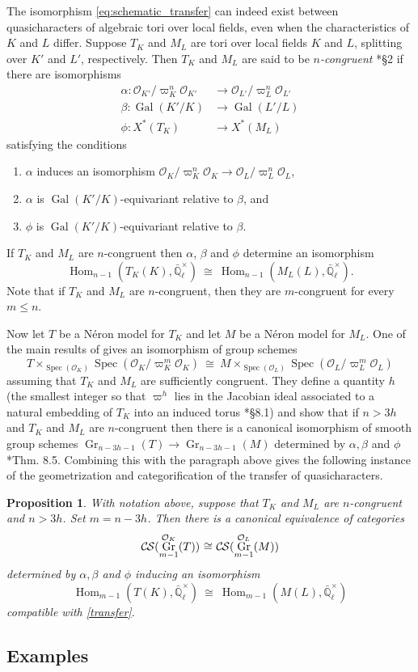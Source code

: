 \documentclass[10pt]{amsart}
\theoremstyle{plain}
\newtheorem{proposition}[theorem]{Proposition}
\theoremstyle{definition}
\theoremstyle{remark}
\newcommand{\EE}{\mathbb{\bar Q}_\ell}
\newcommand{\OK}{\mathcal{O}_K}
\newcommand{\OL}{\mathcal{O}_L}
\newcommand{\OO}[1]{\mathcal{O}_{#1}}
\newcommand{\EEx}{\EE^\times}
\DeclareMathOperator{\Gal}{Gal}
\DeclareMathOperator{\Hom}{Hom}
\DeclareMathOperator{\Gr}{Gr}
\newcommand{\Spec}[1]{{\operatorname{Spec}(#1)}}
\newcommand{\iso}{{\ \cong\ }}
\newcommand{\CS}{{\mathcal{C\hskip-0.8pt S}}}
\begin{document}
The isomorphism \eqref{eq:schematic_transfer} can indeed exist between quasicharacters of algebraic tori over local fields, even when the characteristics of $K$ and $L$ differ.
Suppose $T_K$ and $M_L$ are tori over local fields $K$ and $L$,
splitting over $K'$ and $L'$, respectively.
Then $T_K$ and $M_L$ are said to be \emph{$n$-congruent} \cite{chai-yu:01a}*{\S 2} if there are isomorphisms
 \begin{align*}
  \alpha : \OO{K'}/\varpi_K^n \OO{K'} &\to \OO{L'}/\varpi_{L}^n \OO{L'} \\
  \beta : \Gal(K'/K) &\to \Gal(L'/L) \\
  \phi : X^*(T_K) &\to X^*(M_L)
 \end{align*}
 satisfying the conditions
 \begin{enumerate}
  \item $\alpha$ induces an isomorphism $\OK/\varpi_K^n \OK \to \OO{L}/\varpi_{L}^n \OO{L}$,
  \item $\alpha$ is $\Gal(K'/K)$-equivariant relative to $\beta$, and
  \item $\phi$ is $\Gal(K'/K)$-equivariant relative to $\beta$.
 \end{enumerate}
If $T_K$ and $M_L$ are $n$-congruent then $\alpha$, $\beta$ and $\phi$ determine an isomorphism 
\begin{equation}\label{transfer}
  \Hom_{n-1}(T_K(K), \EEx) \iso \Hom_{n-1}(M_L(L),\EEx).
\end{equation}
Note that if $T_K$ and $M_L$ are $n$-congruent, then they are $m$-congruent for every
$m \leq n$.

Now let $T$ be a N\'eron model for $T_K$ and let $M$ be a N\'eron model for $M_L$.
One of the main results of \cite{chai-yu:01a} gives an isomorphism of group schemes 
\[
T \times_{\Spec{\OK}} \Spec{\OK/\varpi_K^m\OK} \iso M \times_{\Spec{\OL}} \Spec{\OL/\varpi_L^m\OL}
\] 
assuming that $T_K$ and $M_L$ are sufficiently congruent.
They define a quantity $h$ (the smallest integer so that $\varpi^h$ lies in the
Jacobian ideal associated to a natural embedding of $T_K$ into an induced torus \cite{chai-yu:01a}*{\S 8.1}) and show  that if $n > 3h$ and $T_K$ and $M_L$ are $n$-congruent then there is a canonical isomorphism of smooth group schemes
 $
\Gr_{n-3h-1}(T) \to \Gr_{n-3h-1}(M)
 $
 determined by $\alpha, \beta$ and $\phi$ \cite{chai-yu:01a}*{Thm. 8.5}.
Combining this with the paragraph above gives the following instance of the geometrization and categorification of the transfer of quasicharacters.

\begin{proposition}\label{prop:transfer}
 With notation above, suppose that $T_K$ and $M_L$ are $n$-congruent and $n > 3h$.  Set $m = n-3h$.
 Then there is a canonical equivalence of categories
 \[
 \CS(\Gr^{\OK}_{m-1}(T)) \iso \CS(\Gr^{\OL}_{m-1}(M))
 \]
 determined by $\alpha, \beta$ and $\phi$ inducing an isomorphism
 \[
\Hom_{m-1}(T(K), \EEx) \iso  \Hom_{m-1}(M(L), \EEx)
 \]
compatible with \eqref{transfer}.
\end{proposition}


\subsection{Examples}

   
\end{document}
